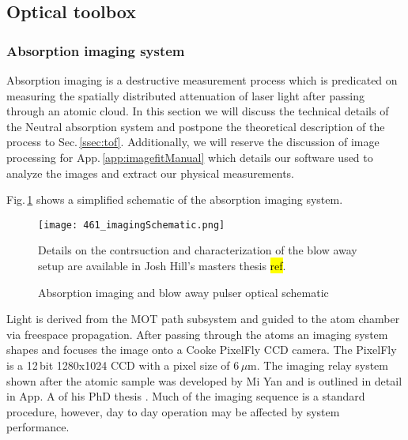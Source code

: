 \pagebreak
\subsection{Optical toolbox} \label{ssec:op_tools}
\subsubsection{Absorption imaging system}
Absorption imaging is a destructive measurement process which is predicated on measuring the spatially distributed attenuation of laser light after passing through an atomic cloud. 
In this section we will discuss the technical details of the Neutral absorption system and postpone the theoretical description of the process to Sec.\,\ref{ssec:tof}.
Additionally, we will reserve the discussion of image processing for App.\,\ref{app:imagefitManual} which details our software used to analyze the images and extract our physical measurements.

Fig.\,\ref{fig:absImagingSchematic} shows a simplified schematic of the absorption imaging system.
	\begin{figure} 
		\centerline{
		\texttt{[image: 461\_imagingSchematic.png]}}
		\caption{Absorption imaging and blow away pulser optical schematic}{Details on the contrsuction and characterization of the blow away setup are available in Josh Hill's masters thesis \hl{ref}.}
		\label{fig:absImagingSchematic}
	\end{figure}
Light is derived from the MOT path subsystem and guided to the atom chamber via freespace propagation. 
After passing through the atoms an imaging system shapes and focuses the image onto a Cooke PixelFly CCD camera.
The PixelFly is a 12\,bit 1280x1024 CCD with a pixel size of 6\,$\mu$m.
The imaging relay system shown after the atomic sample was developed by Mi Yan and is outlined in detail in App. A of his PhD thesis \cite{Yan2013d}. 
Much of the imaging sequence is a standard procedure, however, day to day operation may be affected by system performance.




